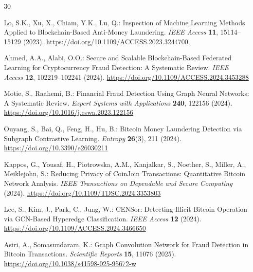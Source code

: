\documentclass[12pt,a4paper]{article}
\begin{document}
\begin{thebibliography}{30}

  Lo, S.K., Xu, X., Chiam, Y.K., Lu, Q.:
  Inspection of Machine Learning Methods Applied to
  Blockchain-Based Anti-Money Laundering.
  \textit{IEEE Access} \textbf{11}, 15114--15129 (2023).
  \url{https://doi.org/10.1109/ACCESS.2023.3244700}

  Ahmed, A.A., Alabi, O.O.:
  Secure and Scalable Blockchain-Based Federated Learning
  for Cryptocurrency Fraud Detection: A Systematic Review.
  \textit{IEEE Access} \textbf{12}, 102219--102241 (2024).
  \url{https://doi.org/10.1109/ACCESS.2024.3453288}

  Motie, S., Raahemi, B.:
  Financial Fraud Detection Using Graph Neural Networks:
  A Systematic Review.
  \textit{Expert Systems with Applications} \textbf{240},
  122156 (2024).
  \url{https://doi.org/10.1016/j.eswa.2023.122156}

  Ouyang, S., Bai, Q., Feng, H., Hu, B.:
  Bitcoin Money Laundering Detection via Subgraph
  Contrastive Learning.
  \textit{Entropy} \textbf{26}(3), 211 (2024).
  \url{https://doi.org/10.3390/e26030211}

  Kappos, G., Yousaf, H., Piotrowska, A.M., Kanjalkar, S.,
  Noether, S., Miller, A., Meiklejohn, S.:
  Reducing Privacy of CoinJoin Transactions: Quantitative
  Bitcoin Network Analysis.
  \textit{IEEE Transactions on Dependable and Secure Computing}
  (2024).
  \url{https://doi.org/10.1109/TDSC.2024.3353803}

  Lee, S., Kim, J., Park, C., Jung, W.:
  CENSor: Detecting Illicit Bitcoin Operation via
  GCN-Based Hyperedge Classification.
  \textit{IEEE Access} \textbf{12} (2024).
  \url{https://doi.org/10.1109/ACCESS.2024.3466650}

  Asiri, A., Somasundaram, K.:
  Graph Convolution Network for Fraud Detection in
  Bitcoin Transactions.
  \textit{Scientific Reports} \textbf{15}, 11076 (2025).
  \url{https://doi.org/10.1038/s41598-025-95672-w}


\end{thebibliography}
\end{document}
